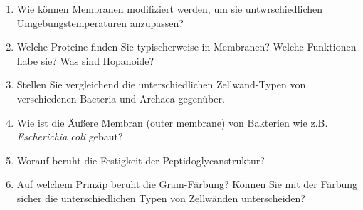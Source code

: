 \begin{enumerate}
		\item Wie können Membranen modifiziert werden, um sie untwrschiedlichen Umgebungstemperaturen anzupassen?
		\item Welche Proteine finden Sie typischerweise in Membranen? Welche Funktionen habe sie? Was sind Hopanoide?
		\item Stellen Sie vergleichend die unterschiedlichen Zellwand-Typen von verschiedenen Bacteria und Archaea gegenüber.
		\item Wie ist die Äußere Membran (outer membrane) von Bakterien wie z.B. \emph{Escherichia coli} gebaut?
		\item Worauf beruht die Festigkeit der Peptidoglycanstruktur? 
		\item Auf welchem Prinzip beruht die Gram-Färbung? Können Sie mit der Färbung sicher die unterschiedlichen Typen von Zellwänden unterscheiden?
	\end{enumerate}
